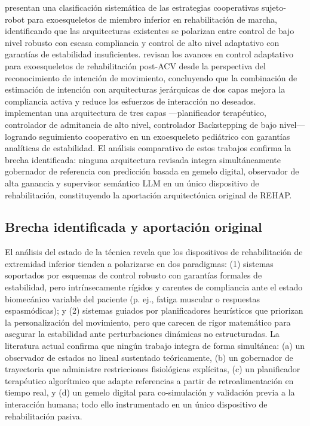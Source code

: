 \documentclass[a4paper,12pt]{article}
\begin{document}
\citet{narayan2023hierarchical} presentan una clasificación sistemática de las estrategias cooperativas sujeto-robot para exoesqueletos de miembro inferior en rehabilitación de marcha, identificando que las arquitecturas existentes se polarizan entre control de bajo nivel robusto con escasa compliancia y control de alto nivel adaptativo con garantías de estabilidad insuficientes. \citet{su2023review} revisan los avances en control adaptativo para exoesqueletos de rehabilitación post-ACV desde la perspectiva del reconocimiento de intención de movimiento, concluyendo que la combinación de estimación de intención con arquitecturas jerárquicas de dos capas mejora la compliancia activa y reduce los esfuerzos de interacción no deseados. \citet{narayan2024adaptive} implementan una arquitectura de tres capas ---planificador terapéutico, controlador de admitancia de alto nivel, controlador Backstepping de bajo nivel--- logrando seguimiento cooperativo en un exoesqueleto pediátrico con garantías analíticas de estabilidad. El análisis comparativo de estos trabajos confirma la brecha identificada: ninguna arquitectura revisada integra simultáneamente gobernador de referencia con predicción basada en gemelo digital, observador de alta ganancia y supervisor semántico LLM en un único dispositivo de rehabilitación, constituyendo la aportación arquitectónica original de REHAP.

\subsection{Brecha identificada y aportación original}

El análisis del estado de la técnica revela que los dispositivos de rehabilitación de extremidad inferior tienden a polarizarse en dos paradigmas: (1) sistemas soportados por esquemas de control robusto con garantías formales de estabilidad, pero intrínsecamente rígidos y carentes de compliancia ante el estado biomecánico variable del paciente (p. ej., fatiga muscular o respuestas espasmódicas); y (2) sistemas guiados por planificadores heurísticos que priorizan la personalización del movimiento, pero que carecen de rigor matemático para asegurar la estabilidad ante perturbaciones dinámicas no estructuradas. La literatura actual confirma que ningún trabajo integra de forma simultánea: (a) un observador de estados no lineal sustentado teóricamente, (b) un gobernador de trayectoria que administre restricciones fisiológicas explícitas, (c) un planificador terapéutico algorítmico que adapte referencias a partir de retroalimentación en tiempo real, y (d) un gemelo digital para co-simulación y validación previa a la interacción humana; todo ello instrumentado en un único dispositivo de rehabilitación pasiva.
\end{document}
